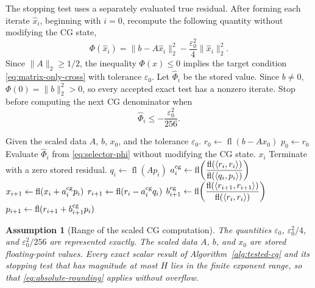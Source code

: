\documentclass[11pt]{article}
\newtheorem{assumption}{Assumption}
\theoremstyle{definition}
\newcommand{\fl}{\operatorname{fl}}
\begin{document}
The stopping test uses a separately evaluated true residual.
After forming each iterate $\widehat x_i$, beginning with $i=0$, recompute
the following quantity without modifying the CG state,
\begin{equation}
 \Phi(\widehat x_i)=\|b-A\widehat x_i\|_2^2
       -\frac{\varepsilon_0^2}{4}\|\widehat x_i\|_2^2.
 \label{eq:selector-phi}
\end{equation}
Since $\|A\|_2\ge1/2$, the inequality $\Phi(x)\le0$ implies the target condition
\eqref{eq:matrix-only-cross} with tolerance $\varepsilon_0$.  Let
$\widehat\Phi_i$ be the stored value.  Since $b\ne0$,
$\Phi(0)=\|b\|_2^2>0$, so every accepted exact test has a nonzero iterate.
Stop before computing the next CG denominator when
\begin{equation}
 \widehat\Phi_i\le-\frac{\varepsilon_0^2}{256}.
 \label{eq:selector-test}
\end{equation}

\begin{algorithm}[htbp]
\caption{Hestenes--Stiefel CG with a true-residual stopping test}
\label{alg:tested-cg}
\begin{algorithmic}[1]
\Statex Given the scaled data $A$, $b$, $x_0$, and the tolerance $\varepsilon_0$.
\State $r_0\gets\fl(b-Ax_0)$
\State $p_0\gets r_0$
  \State Evaluate $\widehat\Phi_i$ from \eqref{eq:selector-phi} without modifying the CG state.
    \State \Return $x_i$
  \EndIf
    \State Terminate with a zero stored residual.
  \EndIf
  \State $q_i\gets\fl(Ap_i)$
  \State $a_i^{\rm cg}\gets\displaystyle\fl\!\left(
    \frac{\fl(\langle r_i,r_i\rangle)}{\fl(\langle q_i,p_i\rangle)}\right)$
  \State $x_{i+1}\gets\fl(x_i+a_i^{\rm cg}p_i)$
  \State $r_{i+1}\gets\fl(r_i-a_i^{\rm cg}q_i)$
  \State $b_{i+1}^{\rm cg}\gets\displaystyle\fl\!\left(
    \frac{\fl(\langle r_{i+1},r_{i+1}\rangle)}{\fl(\langle r_i,r_i\rangle)}\right)$
  \State $p_{i+1}\gets\fl(r_{i+1}+b_{i+1}^{\rm cg}p_i)$
\EndFor
\end{algorithmic}
\end{algorithm}

\begin{assumption}[Range of the scaled CG computation]
\label{ass:cg-range}
The quantities $\varepsilon_0$, $\varepsilon_0^2/4$, and
$\varepsilon_0^2/256$ are represented exactly.  The scaled data $A$, $b$,
and $x_0$ are stored floating-point values.  Every exact scalar result of
Algorithm~\ref{alg:tested-cg} and its stopping test that has magnitude at most
$H$ lies in the finite exponent range, so that
\eqref{eq:absolute-rounding} applies without overflow.
\end{assumption}
\end{document}
